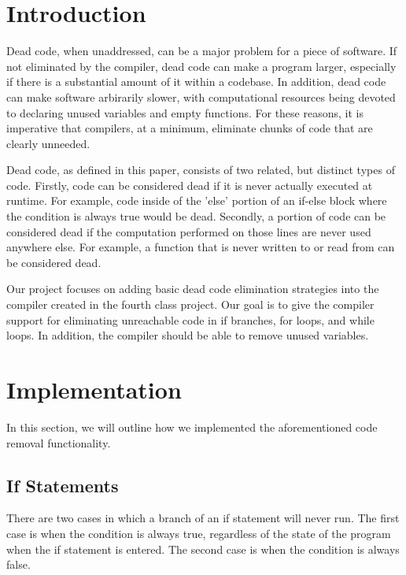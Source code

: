 \documentclass[sigconf]{acmart}
\begin{document}
\maketitle

\section{Introduction}
Dead code, when unaddressed, can be a major problem for a piece of software.
If not eliminated by the compiler, dead code can make a program 
larger, especially if there is a substantial amount of it within a codebase. In addition, dead code 
can make software arbirarily slower, with computational resources being devoted 
to declaring unused variables and empty functions. For these reasons, it is imperative that compilers, at 
a minimum, eliminate chunks of code that are clearly unneeded.

Dead code, as defined in this paper, consists of 
two related, but distinct types of code. Firstly, code can be considered dead if 
it is never actually executed at runtime. For example, code inside of the 'else' portion 
of an if-else block where the condition is always true would be dead. Secondly, a portion of 
code can be considered dead if the computation performed on those lines are never used anywhere else.
For example, a function that is never written to or read from can be considered dead. 

Our project focuses on adding basic dead code elimination strategies into the compiler 
created in the fourth class project. Our goal is to give the compiler support for eliminating
unreachable code in if branches, for loops, and while loops. In addition, the compiler should 
be able to remove unused variables.

\section{Implementation}
In this section, we will outline how we implemented the aforementioned code removal functionality. 

\subsection{If Statements}
There are two cases in which a branch of an if statement will never run. The first case is when the condition 
is always true, regardless of the state of the program when the if statement is entered. The second case is when 
the condition is always false.
\end{document}

